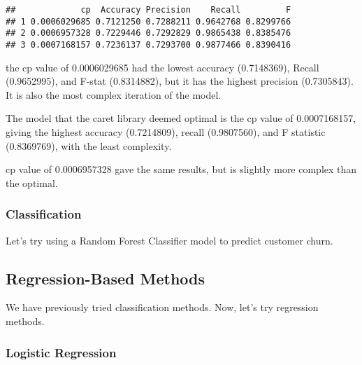 \documentclass[
]{article}
\newenvironment{Shaded}{\begin{snugshade}}{\end{snugshade}}
\newcommand{\CommentTok}[1]{\textcolor[rgb]{0.56,0.35,0.01}{\textit{#1}}}
\newcommand{\FunctionTok}[1]{\textcolor[rgb]{0.13,0.29,0.53}{\textbf{#1}}}
\newcommand{\NormalTok}[1]{#1}
\newcommand{\OtherTok}[1]{\textcolor[rgb]{0.56,0.35,0.01}{#1}}
\newcommand{\SpecialCharTok}[1]{\textcolor[rgb]{0.81,0.36,0.00}{\textbf{#1}}}
\begin{document}
\begin{Shaded}
\end{Shaded}

\begin{verbatim}
##             cp  Accuracy Precision    Recall         F
## 1 0.0006029685 0.7121250 0.7288211 0.9642768 0.8299766
## 2 0.0006957328 0.7229446 0.7292829 0.9865438 0.8385476
## 3 0.0007168157 0.7236137 0.7293700 0.9877466 0.8390416
\end{verbatim}

the cp value of 0.0006029685 had the lowest accuracy (0.7148369), Recall
(0.9652995), and F-stat (0.8314882), but it has the highest precision
(0.7305843). It is also the most complex iteration of the model.

The model that the caret library deemed optimal is the cp value of
0.0007168157, giving the highest accuracy (0.7214809), recall
(0.9807560), and F statistic (0.8369769), with the least complexity.

cp value of 0.0006957328 gave the same results, but is slightly more
complex than the optimal.

\subsubsection{Classification}\label{classification}

Let's try using a Random Forest Classifier model to predict customer
churn.

\subsection{Regression-Based Methods}\label{regression-based-methods}

We have previously tried classification methods. Now, let's try
regression methods.

\subsubsection{Logistic Regression}\label{logistic-regression}
\end{document}
